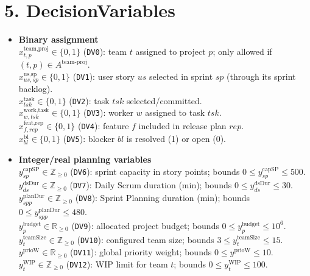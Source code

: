 \documentclass[11pt,a4paper]{article}
\begin{document}
\section{5. DecisionVariables}
\begin{itemize}
  \item \textbf{Binary assignment}\\
  $x^{\text{team,proj}}_{t,p}\in\{0,1\}$ (\texttt{DV0}): team $t$ assigned to project $p$; only allowed if $(t,p)\in A^{\text{team-proj}}$.\\
  $x^{\text{us,sp}}_{us,sp}\in\{0,1\}$ (\texttt{DV1}): user story $us$ selected in sprint $sp$ (through its sprint backlog).\\
  $x^{\text{task}}_{tsk}\in\{0,1\}$ (\texttt{DV2}): task $tsk$ selected/committed.\\
  $x^{\text{work,task}}_{w,tsk}\in\{0,1\}$ (\texttt{DV3}): worker $w$ assigned to task $tsk$.\\
  $x^{\text{feat,rep}}_{f,rep}\in\{0,1\}$ (\texttt{DV4}): feature $f$ included in release plan $rep$.\\
  $x^{\text{bl}}_{bl}\in\{0,1\}$ (\texttt{DV5}): blocker $bl$ is resolved (1) or open (0).
  \item \textbf{Integer/real planning variables}\\
  $y^{\text{capSP}}_{sp}\in \mathbb{Z}_{\ge 0}$ (\texttt{DV6}): sprint capacity in story points; bounds $0\le y^{\text{capSP}}_{sp}\le 500$.\\
  $y^{\text{dsDur}}_{ds}\in \mathbb{Z}_{\ge 0}$ (\texttt{DV7}): Daily Scrum duration (min); bounds $0\le y^{\text{dsDur}}_{ds}\le 30$.\\
  $y^{\text{planDur}}_{spp}\in \mathbb{Z}_{\ge 0}$ (\texttt{DV8}): Sprint Planning duration (min); bounds $0\le y^{\text{planDur}}_{spp}\le 480$.\\
  $y^{\text{budget}}_{p}\in \mathbb{R}_{\ge 0}$ (\texttt{DV9}): allocated project budget; bounds $0\le y^{\text{budget}}_{p}\le 10^6$.\\
  $y^{\text{teamSize}}_{t}\in\mathbb{Z}_{\ge 0}$ (\texttt{DV10}): configured team size; bounds $3\le y^{\text{teamSize}}_{t}\le 15$.\\
  $y^{\text{prioW}} \in \mathbb{R}_{\ge 0}$ (\texttt{DV11}): global priority weight; bounds $0\le y^{\text{prioW}}\le 10$.\\
  $y^{\text{WIP}}_{t}\in\mathbb{Z}_{\ge 0}$ (\texttt{DV12}): WIP limit for team $t$; bounds $0\le y^{\text{WIP}}_{t}\le 100$.
\end{itemize}
\end{document}
